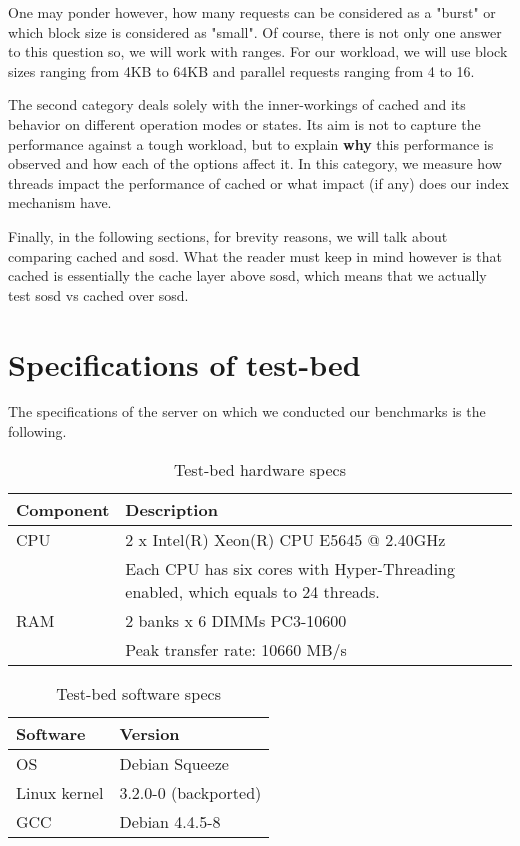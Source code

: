 One may ponder however, how many requests can be considered as a "burst" or 
which block size is considered as "small". Of course, there is not only one 
answer to this question so, we will work with ranges. For our workload, we will 
use block sizes ranging from 4KB to 64KB and parallel requests ranging from 4 
to 16.

The second category deals solely with the inner-workings of cached and its 
behavior on different operation modes or states. Its aim is not to capture the 
performance against a tough workload, but to explain \textbf{why} this 
performance is observed and how each of the options affect it. In this 
category, we measure how threads impact the performance of cached or what 
impact (if any) does our index mechanism have.

Finally, in the following sections, for brevity reasons, we will talk about 
comparing cached and sosd. What the reader must keep in mind however is that 
cached is essentially the cache layer above sosd, which means that we actually 
test sosd vs cached over sosd.

\section{Specifications of test-bed}\label{sec:test-bed}

The specifications of the server on which we conducted our benchmarks is the 
following.

\begin{table}[H]
	\centering
	\begin{tabular}{ | l | l | }
		\hline
		Component & Description \\ \hline \hline
		CPU &  2 x Intel(R) Xeon(R) CPU E5645 @ 2.40GHz \cite{e5645} \\
		 & Each CPU has six cores with Hyper-Threading enabled, which equals to 
		 24 threads. \\ \hline
		RAΜ & 2 banks x 6 DIMMs PC3-10600 \\
		& Peak transfer rate: 10660 MB/s \\ \hline
	\end{tabular}
	\caption{Test-bed hardware specs}
	\label{tab:hardware-specs}
\end{table}

\begin{table}[H]
	\centering
	\begin{tabular}{ | l | l | }
		\hline
		Software & Version \\ \hline \hline
		OS &  Debian Squeeze \\ \hline
		Linux kernel & 3.2.0-0 (backported) \\ \hline
		GCC & Debian 4.4.5-8 \\ \hline
	\end{tabular}
	\caption{Test-bed software specs}
	\label{tab:software-specs}
\end{table}

